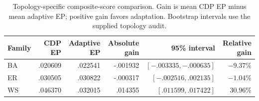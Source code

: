 \begin{table}[!htbp]
\centering\small
\caption{Topology-specific composite-score comparison. Gain is mean CDP EP minus mean adaptive EP; positive gain favors adaptation. Bootstrap intervals use the supplied topology audit.}
\label{tab:topology_results}
\begin{tabular}{lrrrrr}
\toprule
Family & CDP EP & Adaptive EP & Absolute gain & 95\% interval & Relative gain\\
\midrule
BA & .020609 & .022541 & -.001932 & $[-.003335,-.000635]$ & $-9.37\%$\\
ER & .030505 & .030822 & -.000317 & $[-.002516,.002135]$ & $-1.04\%$\\
WS & .046370 & .032015 & .014355 & $[.011599,.017422]$ & $30.96\%$\\
\bottomrule
\end{tabular}
\end{table}
